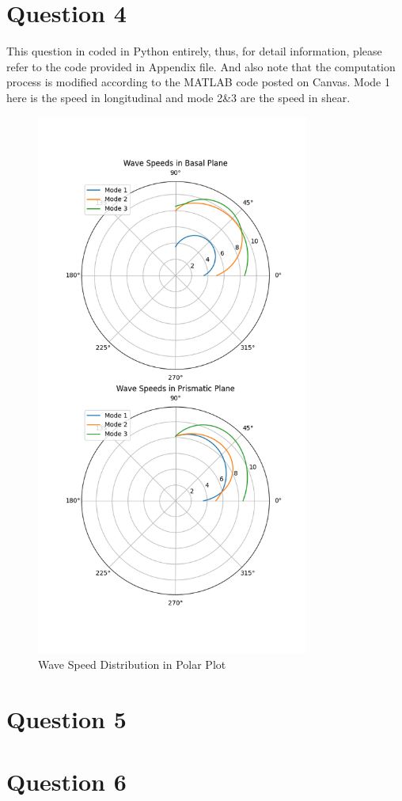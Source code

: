 \documentclass[12pt]{article} %
\begin{document}
\section{Question 4}
This question in coded in Python entirely, thus, for detail information, please refer to the code provided in Appendix file.
And also note that the computation process is modified according to the MATLAB code posted on Canvas. Mode 1 here is the speed in longitudinal and mode 2\&3 are the speed in shear.
\begin{figure}[ht]
    \centering
    \includegraphics[width=0.8\textwidth]{Q4.png}
    \caption{Wave Speed Distribution in Polar Plot}
\end{figure}

\clearpage
\section{Question 5}
\section{Question 6}
\end{document}
